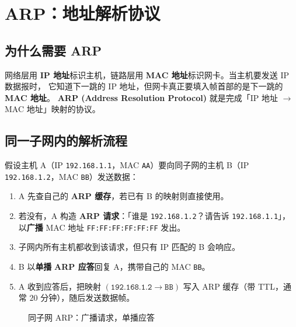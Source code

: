 \section{ARP：地址解析协议}

\subsection{为什么需要 ARP}

网络层用 \textbf{IP 地址}标识主机，链路层用 \textbf{MAC 地址}标识网卡。当主机要发送 IP 数据报时，
它知道下一跳的 IP 地址，但网卡真正要填入帧首部的是下一跳的 \textbf{MAC 地址}。
\textbf{ARP (Address Resolution Protocol)} 就是完成「IP 地址 $\to$ MAC 地址」映射的协议。

\subsection{同一子网内的解析流程}

假设主机 A（IP \texttt{192.168.1.1}，MAC \texttt{AA}）要向同子网的主机 B（IP \texttt{192.168.1.2}，MAC \texttt{BB}）发送数据：

\begin{enumerate}
    \item A 先查自己的 \textbf{ARP 缓存}，若已有 B 的映射则直接使用。
    \item 若没有，A 构造 \textbf{ARP 请求}：「谁是 \texttt{192.168.1.2}？请告诉 \texttt{192.168.1.1}」，
        以\textbf{广播} MAC 地址 \texttt{FF:FF:FF:FF:FF:FF} 发出。
    \item 子网内所有主机都收到该请求，但只有 IP 匹配的 B 会响应。
    \item B 以\textbf{单播} \textbf{ARP 应答}回复 A，携带自己的 MAC \texttt{BB}。
    \item A 收到应答后，把映射 $(\texttt{192.168.1.2} \to \texttt{BB})$ 写入 ARP 缓存（带 TTL，通常 $20$ 分钟），随后发送数据帧。
\end{enumerate}

\begin{figure}[H]
\centering
{}
\caption{同子网 ARP：广播请求，单播应答}
\label{fig:arp_same_subnet}
\end{figure}

